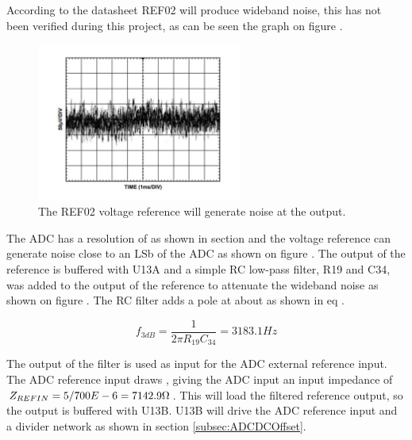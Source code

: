 According to the datasheet REF02 will produce wideband noise, this has not been verified during this project, as can be seen the graph on figure  .
\begin{figure}[H]
    \centering
    \includegraphics[clip, trim=0 25 0 0, width=0.6\textwidth]{Sections/7_SystemDesign/Figures/7_1_3_REFNoise.pdf}
    \caption{The REF02 voltage reference will generate noise at the output.}
    \label{fig_7_1_3_REFNOISE}
\end{figure}

The ADC has a resolution of  as shown in section  and the voltage reference can generate noise close to an LSb of the ADC as shown on figure . The output of the reference is buffered with U13A and a simple RC low-pass filter, R19 and C34, was added to the output of the reference to attenuate the wideband noise as shown on figure . The RC filter adds a pole at about  as shown in eq .

\begin{equation}\label{eq:7_1_3_5VREFSimplePole}
    f_{3dB} = \frac{1}{2\pi R_{19} C_{34}} = 3183.1 Hz
\end{equation}

The output of the filter is used as input for the ADC external reference input. The ADC reference input draws , giving the ADC input an input impedance of $Z_{REFIN} = 5/700E-6 = 7142.9 \ohm$. This will load the filtered reference output, so the output is buffered with U13B. U13B will drive the ADC reference input and a divider network as shown in section \ref{subsec:ADCDCOffset}.

